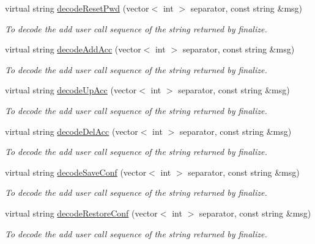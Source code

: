 \begin{DoxyCompactItemize}
virtual string \hyperlink{classUMSMapper_a001ffc8295fb72cd937676973f0520cb}{decodeResetPwd} (vector$<$ int $>$ separator, const string \&msg)
\begin{DoxyCompactList}\small\item\em To decode the add user call sequence of the string returned by finalize. \item\end{DoxyCompactList}\item 
virtual string \hyperlink{classUMSMapper_aad443517f273c610f3ecc38f9e9b817f}{decodeAddAcc} (vector$<$ int $>$ separator, const string \&msg)
\begin{DoxyCompactList}\small\item\em To decode the add user call sequence of the string returned by finalize. \item\end{DoxyCompactList}\item 
virtual string \hyperlink{classUMSMapper_a7be83cb37c8b72e6103c62669381ac5c}{decodeUpAcc} (vector$<$ int $>$ separator, const string \&msg)
\begin{DoxyCompactList}\small\item\em To decode the add user call sequence of the string returned by finalize. \item\end{DoxyCompactList}\item 
virtual string \hyperlink{classUMSMapper_a64e8fa1fe8aa071b405a4c1c67c837ec}{decodeDelAcc} (vector$<$ int $>$ separator, const string \&msg)
\begin{DoxyCompactList}\small\item\em To decode the add user call sequence of the string returned by finalize. \item\end{DoxyCompactList}\item 
virtual string \hyperlink{classUMSMapper_a621d646f3f4525edb990813d31b2ee61}{decodeSaveConf} (vector$<$ int $>$ separator, const string \&msg)
\begin{DoxyCompactList}\small\item\em To decode the add user call sequence of the string returned by finalize. \item\end{DoxyCompactList}\item 
virtual string \hyperlink{classUMSMapper_a26597d9d63ee7db4110669b59460f74f}{decodeRestoreConf} (vector$<$ int $>$ separator, const string \&msg)
\begin{DoxyCompactList}\small\item\em To decode the add user call sequence of the string returned by finalize. \item\end{DoxyCompactList}\item 

\end{DoxyCompactItemize}
